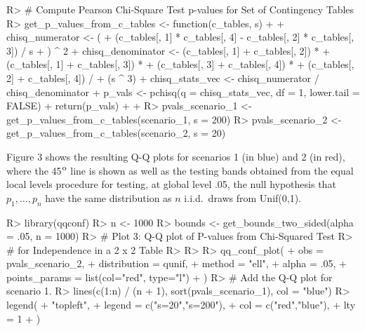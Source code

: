 \documentclass[article]{jss}
\begin{document}
%
\begin{Schunk}
\begin{Sinput}
R> # Compute Pearson Chi-Square Test p-values for Set of Contingency Tables
R> get_p_values_from_c_tables <- function(c_tables, s) {
+    
+    chisq_numerator <- (
+      (c_tables[, 1] * c_tables[, 4] - c_tables[, 2] * c_tables[, 3]) / s
+    ) ^ 2
+    chisq_denominator <- (c_tables[, 1] + c_tables[, 2]) * 
+      (c_tables[, 1] + c_tables[, 3]) * 
+      (c_tables[, 3] + c_tables[, 4]) * 
+      (c_tables[, 2] + c_tables[, 4]) / 
+      (s ^ 3)
+    chisq_stats_vec <- chisq_numerator / chisq_denominator
+    p_vals <- pchisq(q = chisq_stats_vec, df = 1, lower.tail = FALSE)
+    return(p_vals)
+    
+  }
R> pvals_scenario_1 <- get_p_values_from_c_tables(scenario_1, s = 200)
R> pvals_scenario_2 <- get_p_values_from_c_tables(scenario_2, s = 20)
\end{Sinput}
\end{Schunk}
%


Figure 3 shows the resulting Q-Q plots for scenarios 1 (in blue) and 2 (in red), where the 45$^{\mbox{\footnotesize o}}$ line is shown as well as the testing bands obtained from the equal local levels procedure for testing, at global level .05, the null hypothesis that $p_1, \ldots, p_n$ have the same distribution as $n$ i.i.d.\ draws from Unif(0,1).  

\begin{Schunk}
\begin{Sinput}
R> library(qqconf)
R> n <- 1000
R> bounds <- get_bounds_two_sided(alpha = .05, n = 1000)
R> # Plot 3: Q-Q plot of P-values from Chi-Squared Test
R> # for Independence in a 2 x 2 Table
R> 
R> 
R> qq_conf_plot(
+    obs = pvals_scenario_2,
+    distribution = qunif,
+    method = "ell",
+    alpha = .05,
+    points_params = list(col="red", type="l")
+  )
R> # Add the Q-Q plot for scenario 1.
R> lines(c(1:n) / (n + 1), sort(pvals_scenario_1), col = "blue")
R> legend(
+    "topleft", 
+    legend = c("s=20","s=200"), 
+    col = c("red","blue"), 
+    lty = 1
+  )
\end{Sinput}
\end{Schunk}
\end{document}
